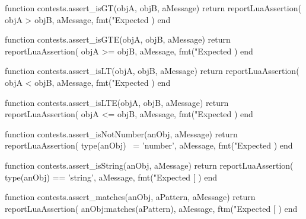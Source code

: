 \stopTestSuite


\startLuaCode
function contests.assert_isGT(objA, objB, aMessage)
  return reportLuaAssertion(
    objA > objB,
    aMessage,
    fmt("Expected %
  )
end
\stopLuaCode

\stopTestSuite


\startLuaCode
function contests.assert_isGTE(objA, objB, aMessage)
  return reportLuaAssertion(
    objA >= objB,
    aMessage,
    fmt("Expected %
  )
end
\stopLuaCode

\stopTestSuite


\startLuaCode
function contests.assert_isLT(objA, objB, aMessage)
  return reportLuaAssertion(
    objA < objB,
    aMessage,
    fmt("Expected %
  )
end
\stopLuaCode

\stopTestSuite


\startLuaCode
function contests.assert_isLTE(objA, objB, aMessage)
  return reportLuaAssertion(
    objA <= objB,
    aMessage,
    fmt("Expected %
  )
end
\stopLuaCode


\stopTestSuite


\startLuaCode
function contests.assert_isNotNumber(anObj, aMessage)
  return reportLuaAssertion(
    type(anObj) ~= 'number',
    aMessage,
    fmt("Expected %
  )
end
\stopLuaCode

\stopTestSuite


\startLuaCode
function contests.assert_isString(anObj, aMessage)
  return reportLuaAssertion(
    type(anObj) == 'string',
    aMessage,
    fmt("Expected [%
  )
end
\stopLuaCode

\stopTestSuite


\startLuaCode
function contests.assert_matches(anObj, aPattern, aMessage)
  return reportLuaAssertion(
    anObj:matches(aPattern),
    aMessage,
    ftm("Expected [%
  )
end
\stopLuaCode

